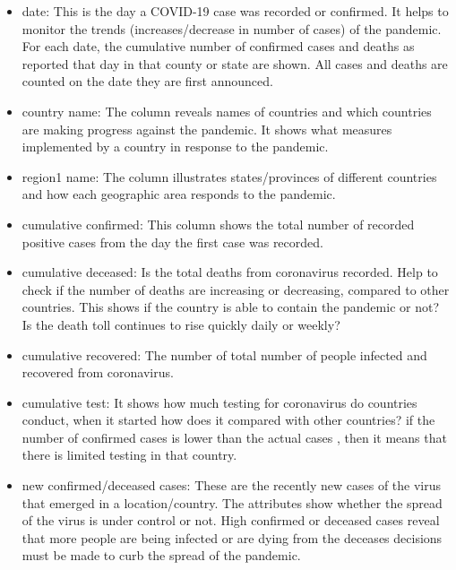 \documentclass[12pt]{article}
\begin{document}
\begin{itemize}
    \item date: This is the day a COVID-19 case was recorded or confirmed. It helps to monitor the trends (increases/decrease in number of cases) of the pandemic. For each date, the cumulative number of confirmed cases and deaths as reported that day in that county or state are shown. All cases and deaths are counted on the date they are first announced.
    
    \item country name: The column reveals names of countries and which countries are making progress against the pandemic. It shows what measures implemented by a country in response to the pandemic.
    
    \item region1 name:  The column illustrates states/provinces of different countries and how each geographic area responds to the pandemic.
    
    \item cumulative confirmed: This column shows the total number of recorded positive cases from the day the first case was recorded. 
      
    \item cumulative deceased:  Is the total deaths from coronavirus recorded. Help to check if the number of deaths are increasing or decreasing, compared to other countries. This shows if the country is able to contain the pandemic or not? Is the death toll continues to rise quickly daily or weekly?
    
    \item cumulative recovered: The number of total number of people infected and recovered from coronavirus.
      
     \item cumulative test:  It shows how much testing for coronavirus do countries conduct, when it started how does it compared with other countries? if the number of confirmed cases is lower than the actual cases , then it means that there is limited testing in that country.
      
    \item new confirmed/deceased cases: These are the recently new cases of the virus that emerged in a location/country. The attributes show whether the spread of the virus is under control or not. High confirmed or deceased cases reveal that more people are being infected or are dying from the deceases decisions must be made to curb the spread of the pandemic.
    
\end{itemize}
\end{document}
